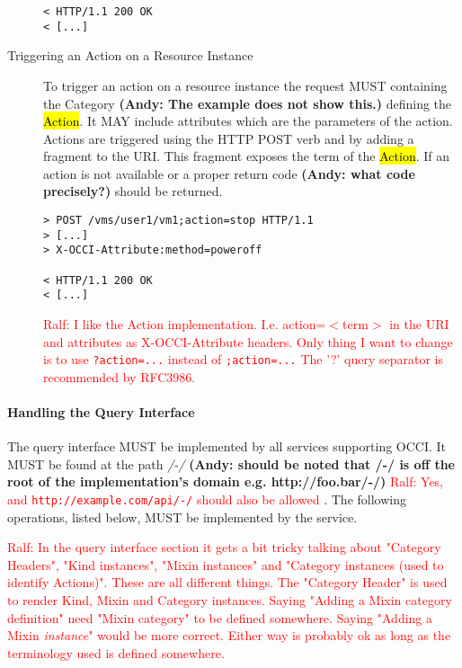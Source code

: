 \documentclass[10pt,a4paper]{article}
\newcommand{\ralf}[1]{\textcolor{red}{Ralf: #1}}
\begin{document}
\begin{description}
\begin{verbatim}
< HTTP/1.1 200 OK
< [...]
\end{verbatim}

\item[Triggering an Action on a Resource Instance] To trigger an
  action on a resource instance the request MUST containing the Category 
  \textbf{(Andy: The example does not show this.)}
  defining the \hl{Action}. It MAY include attributes which are the
  parameters of the action. Actions are triggered using the HTTP POST
  verb and by adding a fragment to the URI. This fragment exposes the
  term of the \hl{Action}. If an action is not available or a proper 
  return code \textbf{(Andy: what code precisely?)} should be returned.
\begin{verbatim}
> POST /vms/user1/vm1;action=stop HTTP/1.1
> [...]
> X-OCCI-Attribute:method=poweroff

< HTTP/1.1 200 OK
< [...]
\end{verbatim}

\ralf{I like the Action implementation. I.e. action=$<$term$>$ in the URI and
attributes as X-OCCI-Attribute headers. Only thing I want to change is to use
{\tt ?action=...} instead of {\tt ;action=...} The '?' query separator is recommended by
RFC3986.}
\end{description}

\paragraph{Handling the Query Interface}
\label{sec:query}
The query interface MUST be implemented by all services supporting
OCCI. It MUST be found at the path \emph{/-/} \textbf{(Andy: should be 
noted that /-/ is off the root of the implementation's domain e.g. http://foo.bar/-/)}
\ralf{Yes, and {\tt http://example.com/api/-/} should also be allowed}
. The following
operations, listed below, MUST be implemented by the service.

\ralf{In the query interface section it gets a bit tricky talking about
"Category Headers", "Kind instances", "Mixin instances" and "Category instances
(used to identify Actions)". These are all different things. The "Category
Header" is used to render Kind, Mixin and Category instances.  Saying "Adding a
Mixin category definition" need "Mixin category" to be defined somewhere.
Saying "Adding a Mixin {\em instance}" would be more correct.  Either way is
probably ok as long as the terminology used is defined somewhere.}
\end{document}
